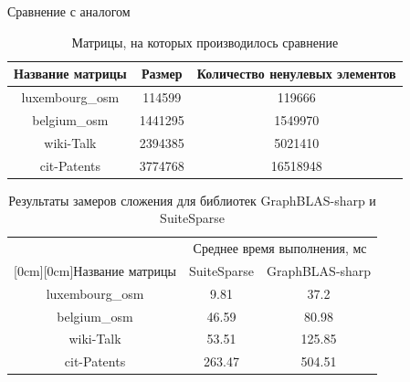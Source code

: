 \documentclass{beamer}
\begin{document}
\begin{frame}{Сравнение с аналогом}

\begin{table}[h]
\center{}

\begin{tabular}{ | c | c | c | }
\hline
Название матрицы & Размер & Количество ненулевых элементов \\ \hline
luxembourg\_osm & 114599 & 119666 \\ \hline
belgium\_osm & 1441295 & 1549970 \\ \hline
wiki-Talk & 2394385 & 5021410 \\ \hline
cit-Patents & 3774768 & 16518948 \\ \hline
\end{tabular}

\caption{Матрицы, на которых производилось сравнение}
\label{matrices}
\end{table}


\begin{table}[h]
\center{}

\begin{tabular}{|c|c|c|}
\hline
& \multicolumn{2}{|c|}{Среднее время выполнения, мс} \\
\cline{2-3}
\raisebox{1.5ex}[0cm][0cm]{Название матрицы}
& SuiteSparse & GraphBLAS-sharp \\
\hline
luxembourg\_osm & 9.81 & 37.2 \\ \hline
belgium\_osm & 46.59 & 80.98 \\ \hline
wiki-Talk & 53.51 & 125.85 \\ \hline
cit-Patents & 263.47 & 504.51 \\ \hline
\end{tabular}

\caption{Результаты замеров сложения для библиотек GraphBLAS-sharp и SuiteSparse}
\label{graphblas-sharp}
\end{table}
    
\end{frame}
\end{document}
